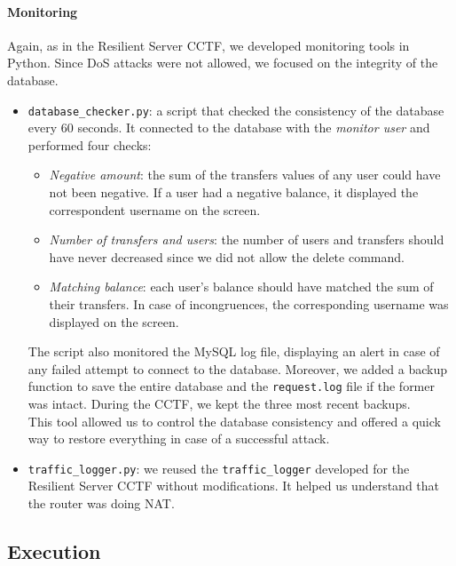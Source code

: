 \paragraph{Monitoring}
\label{sec:cctf-secure:def-prep:monitoring}

Again, as in the Resilient Server CCTF, we developed monitoring tools in Python. Since DoS attacks were not allowed, we focused on the integrity of the database.

\begin{itemize}
    \item \texttt{database\_checker.py}: a script that checked the consistency of the database every 60 seconds. It connected to the database with the \textit{monitor user} and performed four checks:
    \begin{itemize}
        \item \textit{Negative amount}: the sum of the transfers values of any user could have not been negative. If a user had a negative balance, it displayed the correspondent username on the screen.
        \item \textit{Number of transfers and users}: the number of users and transfers should have never decreased since we did not allow the delete command.
        \item \textit{Matching balance}: each user's balance should have matched the sum of their transfers. In case of incongruences, the corresponding username was displayed on the screen.
    \end{itemize}
    The script also monitored the MySQL log file, displaying an alert in case of any failed attempt to connect to the database. Moreover, we added a backup function to save the entire database and the \texttt{request.log} file if the former was intact. During the CCTF, we kept the three most recent backups.
    \\
    This tool allowed us to control the database consistency and offered a quick way to restore everything in case of a successful attack.
    \item \texttt{traffic\_logger.py}: we reused the \texttt{traffic\_logger} developed for the Resilient Server CCTF without modifications. It helped us understand that the router was doing NAT.
\end{itemize}

\subsection{Execution}
\label{sec:cctf-secure:exec}

